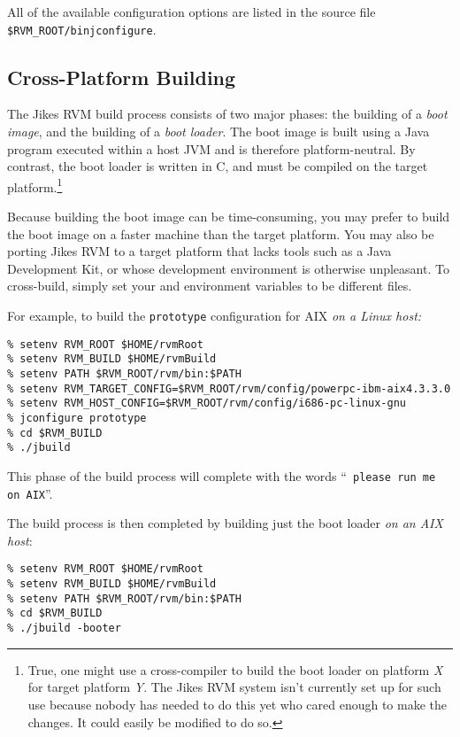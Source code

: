All of the available configuration options are listed in the source
file \texttt{\$RVM\_ROOT\-/bin\/\-j\-con\-fi\-gure}.

\subsection{Cross-Platform Building}\label{cross-platform-building}

The Jikes\TMweb{} RVM build process consists of two major phases:
the building of a 
{\em boot image}, and the building of a {\em boot loader}.
The boot image is built using a Java\TMweb{} program executed within a host
JVM and is therefore platform-neutral.  By contrast, the boot loader
is written in C, and must be compiled on the target
platform.\footnote{True, one might use a cross-compiler to build the
  boot loader on platform \textit{X} for target platform \textit{Y}.
  The Jikes RVM system isn't currently set up for such use because
  nobody has needed to do this yet who cared enough to make the changes.  It could easily be
  modified to do so.}

Because building the boot image can be time-consuming,
you may prefer to build the boot image
on a faster machine than the target platform.  You may also be
porting Jikes RVM to a target platform that lacks tools such as a Java
Development Kit, or whose development environment is otherwise unpleasant. 
To cross-build, simply set your 
 and  environment variables to
be different files.

For example, to build the \texttt{prototype} configuration for AIX\TMweb{} 
{\em on a Linux host:}
\begin{verbatim}
% setenv RVM_ROOT $HOME/rvmRoot
% setenv RVM_BUILD $HOME/rvmBuild
% setenv PATH $RVM_ROOT/rvm/bin:$PATH
% setenv RVM_TARGET_CONFIG=$RVM_ROOT/rvm/config/powerpc-ibm-aix4.3.3.0
% setenv RVM_HOST_CONFIG=$RVM_ROOT/rvm/config/i686-pc-linux-gnu
% jconfigure prototype
% cd $RVM_BUILD
% ./jbuild
\end{verbatim}

This phase of the build process will complete with the words ``{\tt
  please run me on AIX}''.


The build process is then completed by building just the boot loader {\em
  on an AIX host}:

\begin{verbatim}
% setenv RVM_ROOT $HOME/rvmRoot
% setenv RVM_BUILD $HOME/rvmBuild
% setenv PATH $RVM_ROOT/rvm/bin:$PATH
% cd $RVM_BUILD
% ./jbuild -booter
\end{verbatim}

